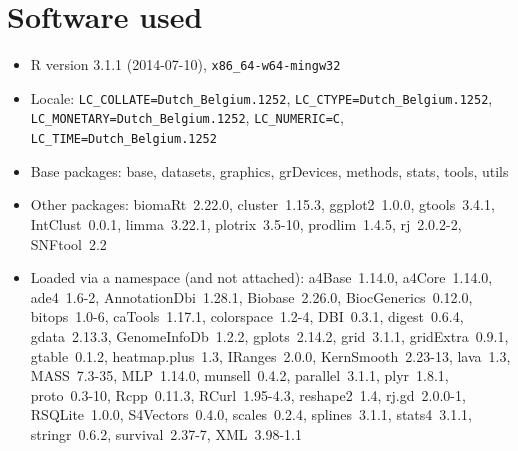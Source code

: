 \documentclass[a4paper]{article}
\begin{document}
\newpage
\section{Software used}
\begin{itemize}\raggedright
  \item R version 3.1.1 (2014-07-10), \verb|x86_64-w64-mingw32|
  \item Locale: \verb|LC_COLLATE=Dutch_Belgium.1252|, \verb|LC_CTYPE=Dutch_Belgium.1252|, \verb|LC_MONETARY=Dutch_Belgium.1252|, \verb|LC_NUMERIC=C|, \verb|LC_TIME=Dutch_Belgium.1252|
  \item Base packages: base, datasets,
    graphics, grDevices, methods, stats,
    tools, utils
  \item Other packages: biomaRt~2.22.0,
    cluster~1.15.3, ggplot2~1.0.0,
    gtools~3.4.1, IntClust~0.0.1,
    limma~3.22.1, plotrix~3.5-10,
    prodlim~1.4.5, rj~2.0.2-2, SNFtool~2.2
  \item Loaded via a namespace (and not
    attached): a4Base~1.14.0, a4Core~1.14.0,
    ade4~1.6-2, AnnotationDbi~1.28.1,
    Biobase~2.26.0, BiocGenerics~0.12.0,
    bitops~1.0-6, caTools~1.17.1,
    colorspace~1.2-4, DBI~0.3.1,
    digest~0.6.4, gdata~2.13.3,
    GenomeInfoDb~1.2.2, gplots~2.14.2,
    grid~3.1.1, gridExtra~0.9.1,
    gtable~0.1.2, heatmap.plus~1.3,
    IRanges~2.0.0, KernSmooth~2.23-13,
    lava~1.3, MASS~7.3-35, MLP~1.14.0,
    munsell~0.4.2, parallel~3.1.1,
    plyr~1.8.1, proto~0.3-10, Rcpp~0.11.3,
    RCurl~1.95-4.3, reshape2~1.4,
    rj.gd~2.0.0-1, RSQLite~1.0.0,
    S4Vectors~0.4.0, scales~0.2.4,
    splines~3.1.1, stats4~3.1.1,
    stringr~0.6.2, survival~2.37-7,
    XML~3.98-1.1
\end{itemize}
\end{document}
